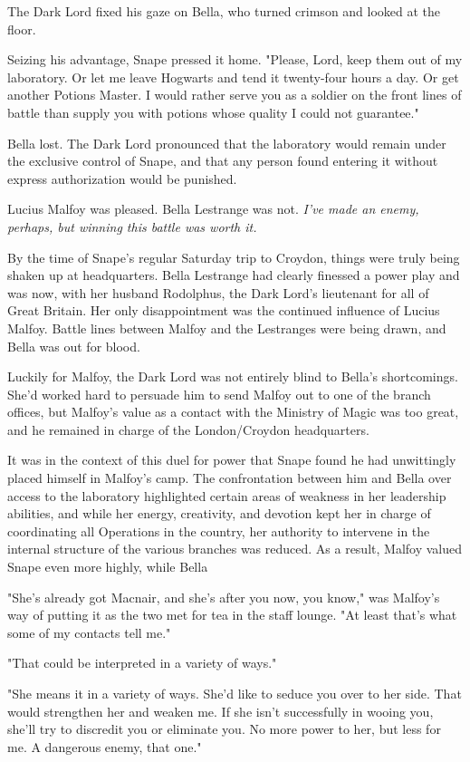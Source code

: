 The Dark Lord fixed his gaze on Bella, who turned crimson and looked at the floor.

Seizing his advantage, Snape pressed it home. "Please, Lord, keep them out of my laboratory. Or let me leave Hogwarts and tend it twenty-four hours a day. Or get another Potions Master. I would rather serve you as a soldier on the front lines of battle than supply you with potions whose quality I could not guarantee."

Bella lost. The Dark Lord pronounced that the laboratory would remain under the exclusive control of Snape, and that any person found entering it without express authorization would be punished.

Lucius Malfoy was pleased. Bella Lestrange was not. \emph{I've made an enemy, perhaps, but winning this battle was worth it.}

By the time of Snape's regular Saturday trip to Croydon, things were truly being shaken up at headquarters. Bella Lestrange had clearly finessed a power play and was now, with her husband Rodolphus, the Dark Lord's lieutenant for all of Great Britain. Her only disappointment was the continued influence of Lucius Malfoy. Battle lines between Malfoy and the Lestranges were being drawn, and Bella was out for blood.

Luckily for Malfoy, the Dark Lord was not entirely blind to Bella's shortcomings. She'd worked hard to persuade him to send Malfoy out to one of the branch offices, but Malfoy's value as a contact with the Ministry of Magic was too great, and he remained in charge of the London\slash Croydon headquarters.

It was in the context of this duel for power that Snape found he had unwittingly placed himself in Malfoy's camp. The confrontation between him and Bella over access to the laboratory highlighted certain areas of weakness in her leadership abilities, and while her energy, creativity, and devotion kept her in charge of coordinating all Operations in the country, her authority to intervene in the internal structure of the various branches was reduced. As a result, Malfoy valued Snape even more highly, while Bella{\el}

"She's already got Macnair, and she's after you now, you know," was Malfoy's way of putting it as the two met for tea in the staff lounge. "At least that's what some of my contacts tell me."

"That could be interpreted in a variety of ways."

"She means it in a variety of ways. She'd like to seduce you over to her side. That would strengthen her and weaken me. If she isn't successfully in wooing you, she'll try to discredit you or eliminate you. No more power to her, but less for me. A dangerous enemy, that one."

